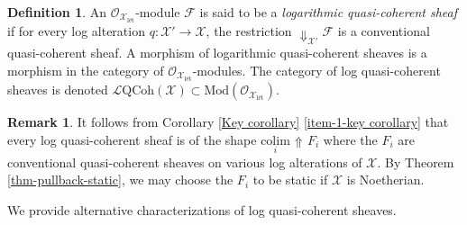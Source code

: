 \documentclass[11pt]{amsart}
\theoremstyle{definition}
\theoremstyle{definition}
\newtheorem{remark}[theorem]{Remark}
\newtheorem{definition}[theorem]{Definition}
\DeclareMathOperator{\arrowup}{\!\Uparrow \!}
\newcommand{\cL}{\mathcal{L}}
\newcommand{\cX}{\mathcal{X}}
\newcommand{\cal}{\mathcal}
\def\cL{{\cal L}}
\def\cX{{\cal X}}
\newcommand{\logqcoh}[1]{\cL \text{QCoh}(#1)}
\begin{document}
\begin{definition}\label{Def:quasi-coherent}
    An $\mathcal{O}_{\mathcal{X}_{\text{l\'et}}}$-module $\mathcal{F}$ is said to be a \textit{logarithmic quasi-coherent sheaf} if for every log alteration $q\colon \mathcal{X}'\rightarrow \mathcal{X}$, the restriction $\Downarrow_{\cX'}\!\! \mathcal{F}$ is a conventional quasi-coherent sheaf. A morphism of logarithmic quasi-coherent sheaves is a morphism in the category of $\mathcal{O}_{\mathcal{X}_{\text{l\'et}}}$-modules. The category of log quasi-coherent sheaves is denoted $\logqcoh{\mathcal{X}}\subset \text{Mod}(\mathcal{O}_{\mathcal{X}_{\text{l\'et}}}).$ 
\end{definition}
\begin{remark}
    It follows from Corollary \ref{Key corollary} \eqref{item-1-key corollary} that every log quasi-coherent sheaf is of the shape $\underset{i}{\mathrm{colim}}\arrowup F_i$ where the $F_i$ are conventional quasi-coherent sheaves on various log alterations of $\cX$. By Theorem \ref{thm-pullback-static}, we may choose the $F_i$ to be static if $\cX$ is Noetherian.
\end{remark}
We provide alternative characterizations of log quasi-coherent sheaves.
\end{document}
